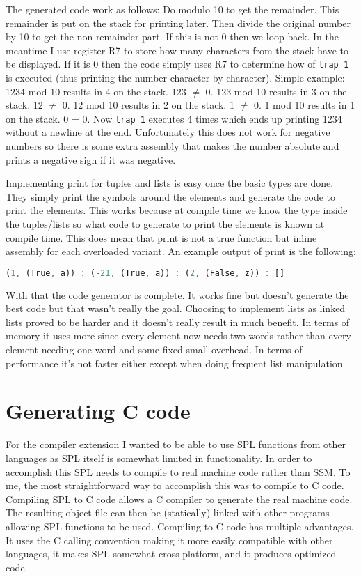 \documentclass{article}
\begin{document}
The generated code work as follows: Do modulo 10 to get the remainder. This remainder is put on the stack for printing later. Then divide the original number by 10 to get the non-remainder part. If this is not 0 then we loop back. In the meantime I use register R7 to store how many characters from the stack have to be displayed. If it is 0 then the code simply uses R7 to determine how of \texttt{trap 1} is executed (thus printing the number character by character). Simple example: 1234 mod 10 results in 4 on the stack. 123 $\neq$ 0. 123 mod 10 results in 3 on the stack. 12 $\neq$ 0. 12 mod 10 results in 2 on the stack. 1 $\neq$ 0. 1 mod 10 results in 1 on the stack. 0 = 0. Now \texttt{trap 1} executes 4 times which ends up printing 1234 without a newline at the end. Unfortunately this does not work for negative numbers so there is some extra assembly that makes the number absolute and prints a negative sign if it was negative.

Implementing print for tuples and lists is easy once the basic types are done. They simply print the symbols around the elements and generate the code to print the elements. This works because at compile time we know the type inside the tuples/lists so what code to generate to print the elements is known at compile time. This does mean that print is not a true function but inline assembly for each overloaded variant. An example output of print is the following:
\begin{lstlisting}[language=Rust, style=boxed]
(1, (True, a)) : (-21, (True, a)) : (2, (False, z)) : []
\end{lstlisting}

With that the code generator is complete. It works fine but doesn't generate the best code but that wasn't really the goal. Choosing to implement lists as linked lists proved to be harder and it doesn't really result in much benefit. In terms of memory it uses more since every element now needs two words rather than every element needing one word and some fixed small overhead. In terms of performance it's not faster either except when doing frequent list manipulation.

\section{Generating C code}
For the compiler extension I wanted to be able to use SPL functions from other languages as SPL itself is somewhat limited in functionality. In order to accomplish this SPL needs to compile to real machine code rather than SSM. To me, the most straightforward way to accomplish this was to compile to C code. Compiling SPL to C code allows a C compiler to generate the real machine code. The resulting object file can then be (statically) linked with other programs allowing SPL functions to be used. Compiling to C code has multiple advantages. It uses the C calling convention making it more easily compatible with other languages, it makes SPL somewhat cross-platform, and it produces optimized code.
\end{document}
